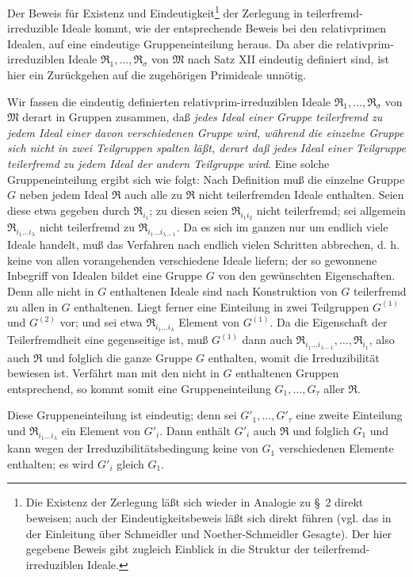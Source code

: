 \documentclass[11pt]{article}
\newcommand{\ideal}[1]{\mathfrak{#1}}
\begin{document}
Der Beweis für Existenz und Eindeutigkeit\footnote{Die Existenz der Zerlegung läßt sich wieder in Analogie zu \S~2 direkt beweisen; auch der Eindeutigkeitsbeweis läßt sich direkt führen (vgl. das in der Einleitung über Schmeidler und Noether-Schmeidler Gesagte). Der hier gegebene Beweis gibt zugleich Einblick in die Struktur der teilerfremd-irreduziblen Ideale.} der Zerlegung in teilerfremd-irreduzible Ideale kommt, wie der entsprechende Beweis bei den relativprimen Idealen, auf eine eindeutige Gruppeneinteilung heraus. Da aber die relativprim-irreduziblen Ideale $\ideal R_1,
\ldots,\ideal R_\sigma$ von $\ideal M$ nach Satz XII eindeutig definiert sind, ist hier ein Zurückgehen auf die zugehörigen Primideale unnötig.

Wir fassen die eindeutig definierten relativprim-irreduziblen Ideale $\ideal R_1,
\ldots,\ideal R_\sigma$ von $\ideal M$ derart in Gruppen zusammen, daß \emph{jedes Ideal einer Gruppe teilerfremd zu jedem Ideal einer davon verschiedenen Gruppe wird, während die einzelne Gruppe sich nicht in zwei Teilgruppen spalten läßt, derart daß jedes Ideal einer Teilgruppe teilerfremd zu jedem Ideal der andern Teilgruppe wird}. Eine solche Gruppeneinteilung ergibt sich wie folgt: Nach Definition muß die einzelne Gruppe $G$ neben jedem Ideal $\ideal R$ auch alle zu $\ideal R$ nicht teilerfremden Ideale enthalten. Seien diese etwa gegeben durch $\ideal R_{i_1}$; zu diesen seien $\ideal R_{i_1i_2}$ nicht teilerfremd; sei allgemein $\ideal R_{i_1\ldots i_\lambda}$ nicht teilerfremd zu $\ideal R_{i_1\ldots i_{\lambda-1}}$. Da es sich im ganzen nur um endlich viele Ideale handelt, muß das Verfahren nach endlich vielen Schritten abbrechen, d. h. keine von allen vorangehenden verschiedene Ideale liefern; der so gewonnene Inbegriff von Idealen bildet eine Gruppe $G$ von den gewünschten Eigenschaften. Denn alle nicht in $G$ enthaltenen Ideale sind nach Konstruktion von $G$ teilerfremd zu allen in $G$ enthaltenen. Liegt ferner eine Einteilung in zwei Teilgruppen $G^{(1)}$ und $G^{(2)}$ vor; und sei etwa $\ideal R_{i_1\ldots i_\lambda}$ Element von $G^{(1)}$. Da die Eigenschaft der Teilerfremdheit eine gegenseitige ist, muß $G^{(1)}$ dann auch $\ideal R_{i_1\ldots i_{\lambda-1}},
\ldots,\ideal R_{i_1}$, also auch $\ideal R$ und folglich die ganze Gruppe $G$ enthalten, womit die Irreduzibilität bewiesen ist. Verfährt man mit den nicht in $G$ enthaltenen Gruppen entsprechend, so kommt somit eine Gruppeneinteilung $G_1,
\ldots,G_\tau$ aller $\ideal R$.

Diese Gruppeneinteilung ist eindeutig; denn sei $G'_1,
\ldots,G'_\tau$ eine zweite Einteilung und $\ideal R_{i_1\ldots i_\lambda}$ ein Element von $G'_i$. Dann enthält $G'_i$ auch $\ideal R$ und folglich $G_1$ und kann wegen der Irreduzibilitätsbedingung keine von $G_1$ verschiedenen Elemente enthalten; es wird $G'_i$ gleich $G_1$.
\end{document}
